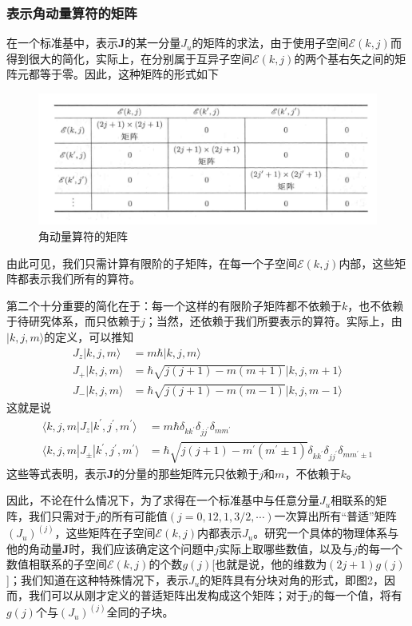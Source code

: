 \documentclass[]{article}
\begin{document}
\subsubsection{表示角动量算符的矩阵}
在一个标准基中，表示$\boldsymbol{J}$的某一分量$J_u$的矩阵的求法，由于使用子空间$\mathscr{E}(k,j)$而得到很大的简化，实际上，在分别属于互异子空间$\mathscr{E}(k,j)$的两个基右矢之间的矩阵元都等于零。因此，这种矩阵的形式如下
\begin{figure}[H]
	\centering
	\includegraphics[scale=0.2]{2.png}
	\caption{角动量算符的矩阵}
	\label{Figure 2}
\end{figure}
由此可见，我们只需计算有限阶的子矩阵，在每一个子空间$\mathscr{E}(k,j)$内部，这些矩阵都表示我们所有的算符。\par 
第二个十分重要的简化在于：每一个这样的有限阶子矩阵都不依赖于$k$，也不依赖于待研究体系，而只依赖于$j$；当然，还依赖于我们所要表示的算符。实际上，由$|k,j,m\rangle$的定义，可以推知
\begin{align}
	J_z|k,j,m\rangle&=m\hbar|k,j,m\rangle\nonumber\\
	J_+|k,j,m\rangle&=\hbar\sqrt{j(j+1)-m(m+1)}|k,j,m+1\rangle\nonumber\\
	J_-|k,j,m\rangle&=\hbar\sqrt{j(j+1)-m(m-1)}|k,j,m-1\rangle
	\label{c50c50}
\end{align}
这就是说
\begin{align}
	\langle k,j,m|J_z|k^\prime,j^\prime,m^\prime\rangle&=m\hbar\delta_{kk^\prime}\delta_{jj^\prime}\delta_{mm^\prime}\nonumber\\
	\langle k,j,m|J_\pm|k^\prime,j^\prime,m^\prime\rangle&=\hbar\sqrt{j(j+1)-m^\prime(m^\prime\pm1)}\delta_{kk^\prime}\delta_{jj^\prime}\delta_{mm^\prime\pm1}
	\label{c51c51}
\end{align}
这些等式表明，表示$\boldsymbol{J}$的分量的那些矩阵元只依赖于$j$和$m$，不依赖于$k$。\par 
因此，不论在什么情况下，为了求得在一个标准基中与任意分量$J_u$相联系的矩阵，我们只需对于$j$的所有可能值$(j=0,12,1,3/2,\cdots)$一次算出所有“普适”矩阵$(J_u)^{(j)}$，这些矩阵在子空间$\mathscr{E}(k,j)$内都表示$J_u$。研究一个具体的物理体系与他的角动量$\boldsymbol{J}$时，我们应该确定这个问题中$j$实际上取哪些数值，以及与$j$的每一个数值相联系的子空间$\mathscr{E}(k,j)$的个数$g(j)$[也就是说，他的维数为$(2j+1)g(j)$]；我们知道在这种特殊情况下，表示$J_u$的矩阵具有分块对角的形式，即图2，因而，我们可以从刚才定义的普适矩阵出发构成这个矩阵；对于$j$的每一个值，将有$g(j)$个与$(J_u)^{(j)}$全同的子块。\par 
\end{document}
